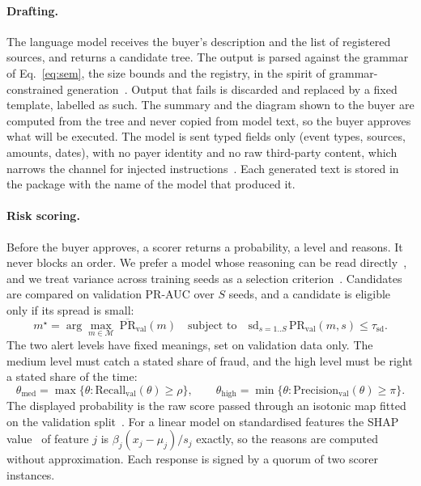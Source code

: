 \documentclass[10pt,a4paper]{article}
\theoremstyle{tight}
\begin{document}
\paragraph{Drafting.} The language model receives the buyer's description and the list of registered sources, and
returns a candidate tree. The output is parsed against the grammar of Eq.~\eqref{eq:sem}, the size bounds and the
registry, in the spirit of grammar-constrained generation~\cite{geng2023}. Output that fails is discarded and
replaced by a fixed template, labelled as such. The summary and the diagram shown to the buyer are computed from
the tree and never copied from model text, so the buyer approves what will be executed. The model is sent typed
fields only (event types, sources, amounts, dates), with no payer identity and no raw third-party content, which
narrows the channel for injected instructions~\cite{greshake2023}. Each generated text is stored in the package
with the name of the model that produced it.

\paragraph{Risk scoring.} Before the buyer approves, a scorer returns a probability, a level and reasons. It never
blocks an order. We prefer a model whose reasoning can be read directly~\cite{rudin2019}, and we treat variance
across training seeds as a selection criterion~\cite{bouthillier2021}. Candidates are compared on validation PR-AUC
over $S$ seeds, and a candidate is eligible only if its spread is small:
\begin{equation}\label{eq:select}
m^\star = \arg\max_{m \in \mathcal{M}}\ \overline{\mathrm{PR}}_{\mathrm{val}}(m) \quad \text{subject to} \quad
\mathrm{sd}_{s=1..S}\,\mathrm{PR}_{\mathrm{val}}(m, s) \le \tau_{\mathrm{sd}} .
\end{equation}
The two alert levels have fixed meanings, set on validation data only. The medium level must catch a stated share
of fraud, and the high level must be right a stated share of the time:
\begin{equation}\label{eq:thr}
\theta_{\mathrm{med}} = \max\{\theta : \mathrm{Recall}_{\mathrm{val}}(\theta) \ge \rho\}, \qquad
\theta_{\mathrm{high}} = \min\{\theta : \mathrm{Precision}_{\mathrm{val}}(\theta) \ge \pi\}.
\end{equation}
The displayed probability is the raw score passed through an isotonic map fitted on the validation
split~\cite{zadrozny2002,niculescu2005}. For a linear model on standardised features the SHAP
value~\cite{lundberg2017} of feature $j$ is $\beta_j (x_j - \mu_j)/s_j$ exactly, so the reasons are computed without
approximation. Each response is signed by a quorum of two scorer instances.
\end{document}
